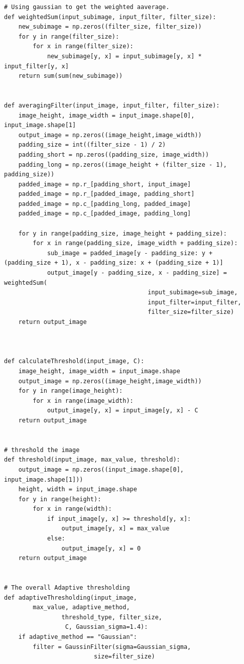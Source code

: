 \documentclass[12pt]{article}
\begin{document}
\begin{enumerate}[leftmargin=\labelsep]
\begin{enumerate}
\begin{lstlisting}
# Using gaussian to get the weighted aaverage.
def weightedSum(input_subimage, input_filter, filter_size):
    new_subimage = np.zeros((filter_size, filter_size))
    for y in range(filter_size):
        for x in range(filter_size):
            new_subimage[y, x] = input_subimage[y, x] * input_filter[y, x]
    return sum(sum(new_subimage))


def averagingFilter(input_image, input_filter, filter_size):
    image_height, image_width = input_image.shape[0], input_image.shape[1]
    output_image = np.zeros((image_height,image_width))
    padding_size = int((filter_size - 1) / 2)
    padding_short = np.zeros((padding_size, image_width))
    padding_long = np.zeros((image_height + (filter_size - 1), padding_size))
    padded_image = np.r_[padding_short, input_image]
    padded_image = np.r_[padded_image, padding_short]
    padded_image = np.c_[padding_long, padded_image]
    padded_image = np.c_[padded_image, padding_long]

    for y in range(padding_size, image_height + padding_size):
        for x in range(padding_size, image_width + padding_size):
            sub_image = padded_image[y - padding_size: y + (padding_size + 1), x - padding_size: x + (padding_size + 1)]
            output_image[y - padding_size, x - padding_size] = weightedSum(
                                        input_subimage=sub_image, 
                                        input_filter=input_filter, 
                                        filter_size=filter_size)
    return output_image



def calculateThreshold(input_image, C):
    image_height, image_width = input_image.shape
    output_image = np.zeros((image_height,image_width))
    for y in range(image_height):
        for x in range(image_width):
            output_image[y, x] = input_image[y, x] - C
    return output_image


# threshold the image
def threshold(input_image, max_value, threshold):
    output_image = np.zeros((input_image.shape[0], input_image.shape[1]))
    height, width = input_image.shape
    for y in range(height):
        for x in range(width):
            if input_image[y, x] >= threshold[y, x]:
                output_image[y, x] = max_value
            else:
                output_image[y, x] = 0
    return output_image


# The overall Adaptive thresholding
def adaptiveThresholding(input_image, 
        max_value, adaptive_method, 
                threshold_type, filter_size,
                 C, Gaussian_sigma=1.4):
    if adaptive_method == "Gaussian":
        filter = GaussinFilter(sigma=Gaussian_sigma,
                         size=filter_size)


\end{lstlisting}
\end{enumerate}
\end{enumerate}
\end{document}
